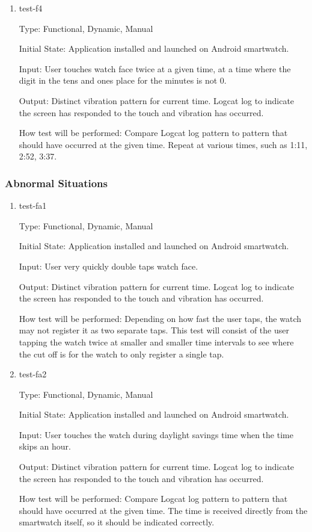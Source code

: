 \begin{enumerate}
\item{test-f4\\}

Type: Functional, Dynamic, Manual
					
Initial State: Application installed and launched on Android smartwatch. 
					
Input: User touches watch face twice at a given time, at a time where the digit in the tens and ones place for the minutes is not 0.
					
Output: Distinct vibration pattern for current time. Logcat log to indicate the screen has responded to the touch and vibration has occurred.  
					
How test will be performed: Compare Logcat log pattern to pattern that should have occurred at the given time. Repeat at various times, such as 1:11, 2:52, 3:37. 

\end{enumerate}


\subsubsection{Abnormal Situations}

\begin{enumerate}

\item{test-fa1\\}

Type: Functional, Dynamic, Manual
					
Initial State: Application installed and launched on Android smartwatch. 
					
Input: User very quickly double taps watch face.
					
Output: Distinct vibration pattern for current time. Logcat log to indicate the screen has responded to the touch and vibration has occurred.
					
How test will be performed: Depending on how fast the user taps, the watch may not register it as two separate taps. This test will consist of the user tapping the watch twice at smaller and smaller time intervals to see where the cut off is for the watch to only register a single tap.
					
\item{test-fa2\\}

Type: Functional, Dynamic, Manual
					
Initial State: Application installed and launched on Android smartwatch. 
					
Input: User touches the watch during daylight savings time when the time skips an hour.
					
Output: Distinct vibration pattern for current time. Logcat log to indicate the screen has responded to the touch and vibration has occurred.
					
How test will be performed: Compare Logcat log pattern to pattern that should have occurred at the given time. The time is received directly from the smartwatch itself, so it should be indicated correctly.


\end{enumerate}

